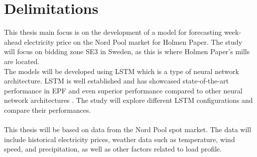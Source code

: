 \section{Delimitations}
\label{sec:delimitations}

This thesis main focus is on the development of a model for forecasting week-ahead electricity price on the Nord Pool market for Holmen Paper. The study will focus on bidding zone SE3 in Sweden, as this is where Holmen Paper's mills are located. 
\\
The models will be developed using LSTM which is a type of neural network architecture. LSTM is well established and has showcased state-of-the-art performance in EPF \cite{spatiotemp} and even superior performance compared to other neural network architectures \cite{stackedlstm}. The study will explore different LSTM configurations and compare their performances. 
\\\\
This thesis will be based on data from the Nord Pool spot market. The data will include historical electricity prices, weather data such as temperature, wind speed, and precipitation, as well as other factors related to load profile. 



